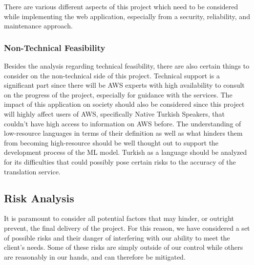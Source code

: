\begin{itemize}
  There are various different aspects of this project which need to be considered while implementing the web application, especially from a security, reliability, and maintenance approach. 
\end{itemize}

\subsubsection*{Non-Technical Feasibility}
Besides the analysis regarding technical feasibility, there are also certain things to consider on the non-technical side of this project. Technical support is a significant part since there will be AWS experts with high availability to consult on the progress of the project, especially for guidance with the services. The impact of this application on society should also be considered since this project will highly affect users of AWS, specifically Native Turkish Speakers, that couldn't have high access to information on AWS before. The understanding of low-resource languages in terms of their definition as well as what hinders them from becoming high-resource should be well thought out to support the development process of the ML model. Turkish as a language should be analyzed for its difficulties that could possibly pose certain risks to the accuracy of the translation service. 





\subsection{Risk Analysis}
\indent\indent It is paramount to consider all potential factors that may hinder, or outright prevent, the final delivery of the project. For this reason, we have considered a set of possible risks and their danger of interfering with our ability to meet the client's needs. Some of these risks are simply outside of our control while others are reasonably in our hands, and can therefore be mitigated. 



